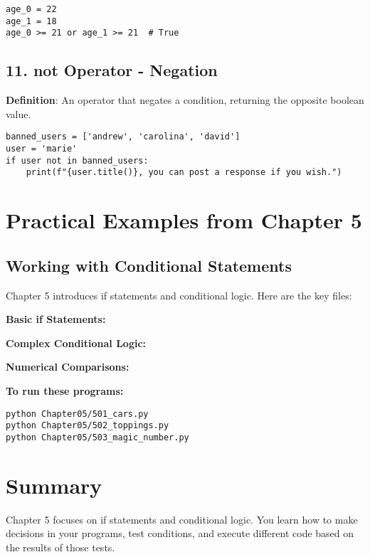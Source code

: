 \begin{lstlisting}
age_0 = 22
age_1 = 18
age_0 >= 21 or age_1 >= 21  # True
\end{lstlisting}

\subsection*{11. not Operator - Negation}
\textbf{Definition}: An operator that negates a condition, returning the opposite boolean value.

\begin{lstlisting}
banned_users = ['andrew', 'carolina', 'david']
user = 'marie'
if user not in banned_users:
    print(f"{user.title()}, you can post a response if you wish.")
\end{lstlisting}

\section*{Practical Examples from Chapter 5}

\subsection*{Working with Conditional Statements}
Chapter 5 introduces if statements and conditional logic. Here are the key files:

\textbf{Basic if Statements:}


\textbf{Complex Conditional Logic:}


\textbf{Numerical Comparisons:}


\textbf{To run these programs:}
\begin{verbatim}
python Chapter05/501_cars.py
python Chapter05/502_toppings.py
python Chapter05/503_magic_number.py
\end{verbatim}

\section*{Summary}
Chapter 5 focuses on if statements and conditional logic. You learn how to make decisions in your programs, test conditions, and execute different code based on the results of those tests.

